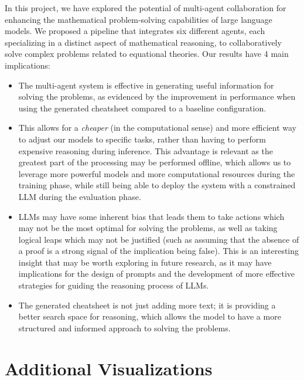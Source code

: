 \documentclass{article}
\begin{document}
In this project, we have explored the potential of multi-agent collaboration for enhancing the mathematical problem-solving capabilities of large language models. We proposed a pipeline that integrates six different agents, each specializing in a distinct aspect of mathematical reasoning, to collaboratively solve complex problems related to equational theories. Our results have 4 main implications:
\begin{itemize}
  \item The multi-agent system is effective in generating useful information for solving the problems, as evidenced by the improvement in performance when using the generated cheatsheet compared to a baseline configuration.
  \item This allows for a \textit{cheaper} (in the computational sense) and more efficient way to adjust our models to specific tasks, rather than having to perform expensive reasoning during inference. This advantage is relevant as the greatest part of the processing may be performed offline, which allows us to leverage more powerful models and more computational resources during the training phase, while still being able to deploy the system with a constrained LLM during the evaluation phase.
  \item LLMs may have some inherent bias that leads them to take actions which may not be the most optimal for solving the problems, as well as taking logical leaps which may not be justified (such as assuming that the absence of a proof is a strong signal of the implication being false). This is an interesting insight that may be worth exploring in future research, as it may have implications for the design of prompts and the development of more effective strategies for guiding the reasoning process of LLMs.
  \item The generated cheatsheet is not just adding more text; it is providing a better search space for reasoning, which allows the model to have a more structured and informed approach to solving the problems.
\end{itemize}

\newpage



\newpage
\appendix

\section{Additional Visualizations}
\label{appendix:additional_visualizations}
\end{document}

